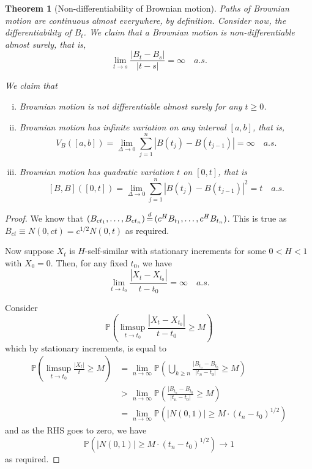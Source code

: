 \documentclass[10pt, oneside, reqno]{amsart}
\theoremstyle{plain}%
\newtheorem{thm}{Theorem}[section]
\theoremstyle{definition}
\theoremstyle{remark}
\renewcommand{\P}{\mathbb{P}}
\def\eqd{\,{\buildrel d \over =}\,}
\begin{document}
\begin{thm}[Non-differentiability of Brownian motion]
    Paths of Brownian motion are continuous almost everywhere, by definition.  Consider now, the differentiability of $B_t$.  We claim that a Brownian motion is non-differentiable almost surely, that is, \[
        \lim_{t \rightarrow s} \frac{|B_t - B_s|}{|t - s|} = \infty \quad a.s.
    \]
    
    We claim that
    \begin{enumerate}[(i)]
        \item Brownian motion is not differentiable almost surely for any $t \geq 0$.
        \item Brownian motion has infinite variation on any interval $[a,b]$, that is,\[
            V_B([a,b]) = \lim_{\Delta \rightarrow 0} \sum_{j=1}^n |B(t_j) - B(t_{j-1})| = \infty \quad a.s.
        \]
        \item Brownian motion has quadratic variation $t$ on $[0,t]$, that is \[
            [B,B]([0,t]) = \lim_{\Delta \rightarrow 0} \sum_{j=1}^n |B(t_j) - B(t_{j-1})|^2 = t \quad a.s.
        \] 
    \end{enumerate}
\end{thm} 

\begin{proof}
    We know that $(B_{ct_1},\dots, B_{ct_n} ) \eqd (c^H B_{t_1}, \dots, c^H B_{t_n})$.  This is true as $B_{ct} \equiv N(0, ct) = c^{1/2} N(0,t)$ as required.  
    
    Now suppose $X_t$ is $H$-self-similar with stationary increments for some $0 < H < 1$ with $X_0 = 0$.  Then, for any fixed $t_0$, we have \[
        \lim_{t \rightarrow t_0} \frac{|X_t - X_{t_0}|}{t - t_0} = \infty \quad a.s.
    \]
    
    Consider
    \[
        \P( \limsup_{t \rightarrow t_0} \frac{ |X_t - X_{t_0} |}{t - t_0} \geq M) 
    \] which by stationary increments, is equal to 
    \begin{align*}
        \P( \limsup_{t \rightarrow t_0} \frac{ |X_t |}{t} \geq M) &= \lim_{n \rightarrow \infty}\P( \bigcup_{k \geq n} \frac{|B_{t_n} - B_{t_0}}{|t_n - t_0|} \geq M) \\
        &> \lim_{n\rightarrow \infty} \P( \frac{|B_{t_n} - B_{t_0}}{|t_n - t_0|} \geq M ) \\
        &= \lim_{n \rightarrow \infty} \P( |N(0,1) | \geq M \cdot (t_n - t_0)^{1/2})
    \end{align*}
    and as the RHS goes to zero, we have \[
    \P( |N(0,1) | \geq M \cdot (t_n - t_0)^{1/2}) \rightarrow 1
    \]
    as required.
\end{proof}
\end{document}
